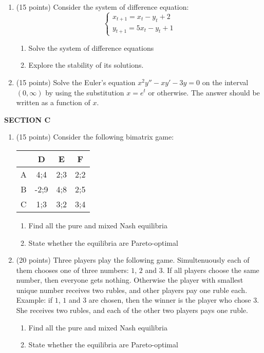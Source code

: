 \documentclass[12pt,a4paper]{article}
\begin{document}
\begin{enumerate}[resume]
\item (15 points)  Consider the system of difference equation:
\[
\begin{cases}
x_{t+1}=x_t-y_t+2 \\
y_{t+1}=5x_t-y_t+1
\end{cases}
\]

\begin{enumerate}
\item Solve the system of difference equations 
\item Explore the stability of its solutions.
\end{enumerate}

\item   (15 points)   Solve the  Euler’s equation $x^2y''-xy'-3y=0$ on the interval $(0,\infty)$ by using the substitution $x=e^t$ or otherwise. The answer should be written as a function of $x$.

\end{enumerate}


\textbf{SECTION C}

\begin{enumerate}[resume]
\item  (15 points)   Consider the following bimatrix game:


\begin{tabular}{c|ccc}
 & D & E & F \\ 
\hline 
A & 4;4 & 2;3 & 2;2  \\ 
B & -2;9 & 4;8 & 2;5  \\ 
C & 1;3 & 3;2 & 3;4  \\ 
\end{tabular} 

\begin{enumerate}
\item Find all the pure and mixed Nash equilibria
\item State whether the equilibria are Pareto-optimal
\end{enumerate}

\item  (20 points)  Three players play the following game. Simultenuously each of them chooses one of three numbers: $1$, $2$ and $3$. If all players choose the same number, then everyone gets nothing. Otherwise the player with smallest unique number receives two rubles, and other players pay one ruble each. Example: if $1$, $1$ and $3$ are chosen, then the winner is the player who chose $3$. She receives two rubles, and  each of the other two players pays one ruble.
\begin{enumerate}
\item Find all the pure and mixed Nash equilibria
\item State whether the equilibria are Pareto-optimal
\end{enumerate}



\end{enumerate}
\end{document}
